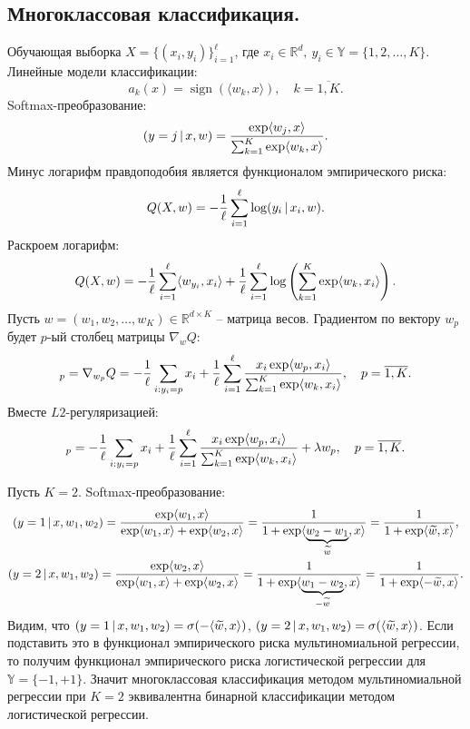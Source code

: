 \documentclass[12pt]{extarticle}
\newcommand{\R}{\mathbb{R}}
\let\P\relax
\newcommand{\P}{\mathbb{P}}
\DeclareMathOperator{\sign}{\text{sign}}
\begin{document}
\subsection{Многоклассовая классификация.}
Обучающая выборка $X=\{(x_i,y_i)\}_{i=1}^\ell$, где $x_i\in\R^d,\ y_i\in\mathbb{Y}=\{1,2,\ldots,K\}$. Линейные модели классификации:
\begin{equation*}
    a_k(x)=\sign(\langle w_k,x\rangle), \quad k=\overline{1,K}.
\end{equation*}
Softmax-преобразование:
\begin{equation*}
    \P(y=j\, |\, x, w)={\exp\langle w_j, x\rangle\over\sum_{k=1}^K\exp\langle w_k, x\rangle}.
\end{equation*}
Минус логарифм правдоподобия является функционалом эмпирического риска:
\begin{equation*}
    Q(X, w)=-{1\over\ell}\sum_{i=1}^\ell\log\P(y_i\, |\, x_i, w).
\end{equation*}
Раскроем логарифм:
\begin{equation*}
    Q(X, w)=-{1\over\ell}\sum_{i=1}^\ell\langle w_{y_i}, x_i\rangle+{1\over\ell}\sum_{i=1}^\ell\log\left(\sum_{k=1}^K\exp\langle w_k, x_i\rangle\right).
\end{equation*}
Пусть $w=(w_1,w_2,\ldots,w_K)\in\R^{d\times K}$ -- матрица весов. Градиентом по вектору $w_p$ будет $p$-ый столбец матрицы $\nabla_wQ$:
\begin{equation*}
    [\nabla_w Q]_p=\nabla_{w_p}Q=-{1\over\ell}\sum_{i:y_i=p}x_i+{1\over\ell}\sum_{i=1}^\ell{x_i\exp\langle w_p, x_i\rangle\over\sum_{k=1}^K\exp\langle w_k,x_i\rangle},\quad p=\overline{1,K}.
\end{equation*}
Вместе $L2$-регуляризацией:
\begin{equation*}
    [\nabla_w Q]_p=-{1\over\ell}\sum_{i:y_i=p}x_i+{1\over\ell}\sum_{i=1}^\ell{x_i\exp\langle w_p, x_i\rangle\over\sum_{k=1}^K\exp\langle w_k,x_i\rangle}+\lambda w_p,\quad p=\overline{1,K}.
\end{equation*}

Пусть $K=2$. Softmax-преобразование:
\begin{gather*}
    \P(y=1\, |\, x, w_1,w_2)={\exp\langle w_1,x\rangle\over\exp\langle w_1,x\rangle+\exp\langle w_2,x\rangle}={1\over1+\exp\langle \underbrace{w_2-w_1}_{\widetilde w},x\rangle}={1\over1+\exp\langle \widetilde w,x\rangle}, \\
    \P(y=2\, |\, x, w_1,w_2)={\exp\langle w_2,x\rangle\over\exp\langle w_1,x\rangle+\exp\langle w_2,x\rangle}={1\over1+\exp\langle \underbrace{w_1-w_2}_{-\widetilde w},x\rangle}={1\over1+\exp\langle -\widetilde w,x\rangle}.
\end{gather*}
Видим, что $\P(y=1\, |\, x,w_1,w_2)=\sigma(-\langle\widetilde w,x\rangle)$, $\P(y=2\, |\, x,w_1,w_2)=\sigma(\langle\widetilde w,x\rangle)$. Если подставить это в функционал эмпирического риска мультиномиальной регрессии, то получим функционал эмпирического риска логистической регрессии для $\mathbb{Y}=\{-1,+1\}$. Значит многоклассовая классификация методом мультиномиальной регрессии при $K=2$ эквивалентна бинарной классификации методом логистической регрессии.
\end{document}
